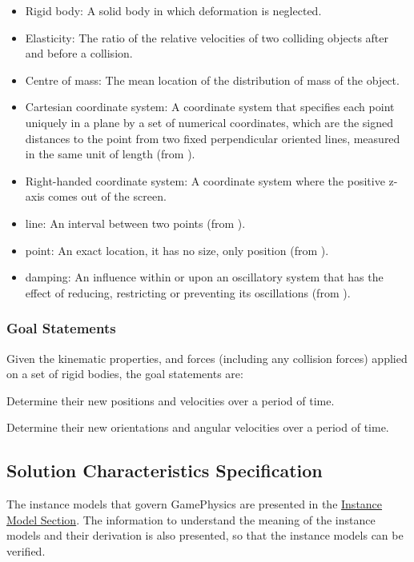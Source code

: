 \documentclass[12pt]{article}
\begin{document}
\begin{itemize}
\item{Rigid body: A solid body in which deformation is neglected.}
\item{Elasticity: The ratio of the relative velocities of two colliding objects after and before a collision.}
\item{Centre of mass: The mean location of the distribution of mass of the object.}
\item{Cartesian coordinate system: A coordinate system that specifies each point uniquely in a plane by a set of numerical coordinates, which are the signed distances to the point from two fixed perpendicular oriented lines, measured in the same unit of length (from \cite{cartesianWiki}).}
\item{Right-handed coordinate system: A coordinate system where the positive z-axis comes out of the screen.}
\item{line: An interval between two points (from \cite{lineSource}).}
\item{point: An exact location, it has no size, only position (from \cite{pointSource}).}
\item{damping: An influence within or upon an oscillatory system that has the effect of reducing, restricting or preventing its oscillations (from \cite{dampingSource}).}
\end{itemize}
\subsubsection{Goal Statements}
\label{Sec:GoalStmt}
Given the kinematic properties, and forces (including any collision forces) applied on a set of rigid bodies, the goal statements are:

\begin{description}[font=\normalfont]
\item[Determine-Linear-Properties:\phantomsection\label{linearGS}]{Determine their new positions and velocities over a period of time.}
\item[Determine-Angular-Properties:\phantomsection\label{angularGS}]{Determine their new orientations and angular velocities over a period of time.}
\end{description}
\subsection{Solution Characteristics Specification}
\label{Sec:SolCharSpec}
The instance models that govern GamePhysics are presented in the \hyperref[Sec:IMs]{Instance Model Section}. The information to understand the meaning of the instance models and their derivation is also presented, so that the instance models can be verified.
\end{document}
